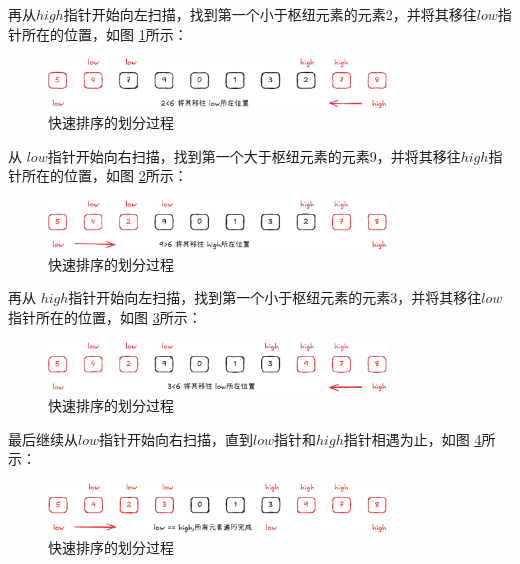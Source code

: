 \documentclass[lang=cn,newtx,10pt,scheme=chinese]{../elegantbook}
\begin{document}
再从$high$指针开始向左扫描，找到第一个小于枢纽元素的元素2，并将其移往$low$指针所在的位置，如图 \ref{fig:patition_e}所示：

\begin{figure}
[h!]
    \centering
    \includegraphics[width=0.8\textwidth]{./figure/pdf/cropped/patition_e.pdf}
    \caption{快速排序的划分过程}
    \label{fig:patition_e}
\end{figure}

从 $low$指针开始向右扫描，找到第一个大于枢纽元素的元素9，并将其移往$high$指针所在的位置，如图 \ref{fig:patition_f}所示：

\begin{figure}
[h!]
    \centering
    \includegraphics[width=0.8\textwidth]{./figure/pdf/cropped/patition_f.pdf}
    \caption{快速排序的划分过程}
    \label{fig:patition_f}
\end{figure}

再从 $high$指针开始向左扫描，找到第一个小于枢纽元素的元素3，并将其移往$low$指针所在的位置，如图 \ref{fig:patition_g}所示：

\begin{figure}
[h!]
    \centering
    \includegraphics[width=0.8\textwidth]{./figure/pdf/cropped/patition_g.pdf}
    \caption{快速排序的划分过程}
    \label{fig:patition_g}
\end{figure}


最后继续从$low$指针开始向右扫描，直到$low$指针和$high$指针相遇为止，如图 \ref{fig:patition_h}所示：

\begin{figure}
[h!]
    \centering
    \includegraphics[width=0.8\textwidth]{./figure/pdf/cropped/patition_h.pdf}
    \caption{快速排序的划分过程}
    \label{fig:patition_h}
\end{figure}
\end{document}
